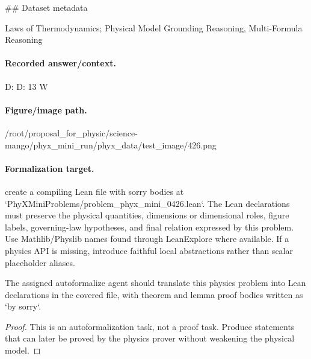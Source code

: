 \#\# Dataset metadata

Laws of Thermodynamics; Physical Model Grounding Reasoning, Multi-Formula Reasoning

\paragraph{Recorded answer/context.}
D: D: 13 W

\paragraph{Figure/image path.}
/root/proposal\_for\_physic/science-mango/phyx\_mini\_run/phyx\_data/test\_image/426.png

\paragraph{Formalization target.}
create a compiling Lean file with sorry bodies at `PhyXMiniProblems/problem\_phyx\_mini\_0426.lean`. The Lean declarations must preserve the physical quantities, dimensions or dimensional roles, figure labels, governing-law hypotheses, and final relation expressed by this problem.
Use Mathlib/Physlib names found through LeanExplore where available. If a physics API is missing, introduce faithful local abstractions rather than scalar placeholder aliases.

\begin{theorem}
\label{thm:physics:phyx_mini_0426:target}
The assigned autoformalize agent should translate this physics problem into Lean declarations in the covered file, with theorem and lemma proof bodies written as `by sorry`.
\end{theorem}
\begin{proof}
This is an autoformalization task, not a proof task. Produce statements that can later be proved by the physics prover without weakening the physical model.
\end{proof}

